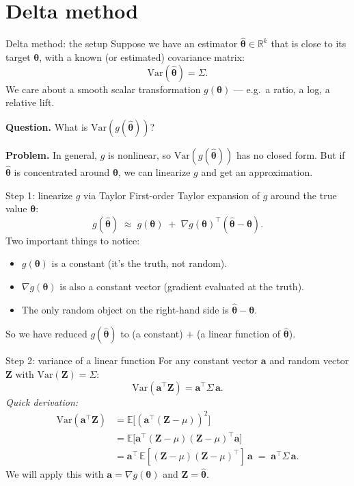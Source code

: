 \documentclass[10pt]{beamer}
\begin{document}
\section{Delta method}

\begin{frame}{Delta method: the setup}
Suppose we have an estimator $\hat{\bm\theta} \in \mathbb{R}^k$ that is close to its target $\bm\theta$, with a known (or estimated) covariance matrix:
\[
\mathrm{Var}(\hat{\bm\theta}) = \Sigma.
\]
We care about a smooth scalar transformation $g(\bm\theta)$ --- e.g.\ a ratio, a log, a relative lift.

\medskip
\textbf{Question.} What is $\mathrm{Var}(g(\hat{\bm\theta}))$?

\medskip
\textbf{Problem.} In general, $g$ is nonlinear, so $\mathrm{Var}(g(\hat{\bm\theta}))$ has no closed form. But if $\hat{\bm\theta}$ is concentrated around $\bm\theta$, we can \alert{linearize} $g$ and get an approximation.
\end{frame}

\begin{frame}{Step 1: linearize $g$ via Taylor}
First-order Taylor expansion of $g$ around the true value $\bm\theta$:
\[
g(\hat{\bm\theta}) \;\approx\; g(\bm\theta) \;+\; \nabla g(\bm\theta)^\top (\hat{\bm\theta} - \bm\theta).
\]
Two important things to notice:
\begin{itemize}
  \item $g(\bm\theta)$ is a \alert{constant} (it's the truth, not random).
  \item $\nabla g(\bm\theta)$ is also a \alert{constant vector} (gradient evaluated at the truth).
  \item The only random object on the right-hand side is $\hat{\bm\theta} - \bm\theta$.
\end{itemize}
So we have reduced $g(\hat{\bm\theta})$ to (a constant) $+$ (a linear function of $\hat{\bm\theta}$).
\end{frame}

\begin{frame}{Step 2: variance of a linear function}
For any constant vector $\mathbf{a}$ and random vector $\mathbf{Z}$ with $\mathrm{Var}(\mathbf{Z}) = \Sigma$:
\[
\mathrm{Var}(\mathbf{a}^\top \mathbf{Z}) = \mathbf{a}^\top \Sigma \,\mathbf{a}.
\]
\textit{Quick derivation:}
\begin{align*}
\mathrm{Var}(\mathbf{a}^\top \mathbf{Z})
  &= \mathbb{E}\big[(\mathbf{a}^\top(\mathbf{Z}-\mu))^2\big] \\
  &= \mathbb{E}\big[\mathbf{a}^\top(\mathbf{Z}-\mu)(\mathbf{Z}-\mu)^\top \mathbf{a}\big] \\
  &= \mathbf{a}^\top \,\mathbb{E}[(\mathbf{Z}-\mu)(\mathbf{Z}-\mu)^\top]\, \mathbf{a}
   \;=\; \mathbf{a}^\top \Sigma\, \mathbf{a}.
\end{align*}
We will apply this with $\mathbf{a} = \nabla g(\bm\theta)$ and $\mathbf{Z} = \hat{\bm\theta}$.
\end{frame}
\end{document}
